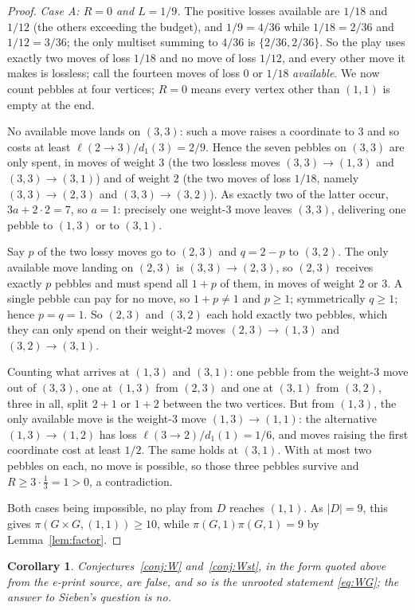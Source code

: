 \documentclass[11pt]{amsart}
\newtheorem{corollary}[theorem]{Corollary}
\theoremstyle{definition}
\begin{document}
\begin{proof}
\emph{Case A: $R=0$ and $L=1/9$.} The positive losses available are $1/18$
and $1/12$ (the others exceeding the budget), and $1/9=4/36$ while
$1/18=2/36$ and $1/12=3/36$; the only multiset summing to $4/36$ is
$\{2/36,2/36\}$. So the play uses exactly two moves of loss $1/18$ and no
move of loss $1/12$, and every other move it makes is lossless; call the
fourteen moves of loss $0$ or $1/18$ \emph{available}. We now count pebbles at
four vertices; $R=0$ means every vertex other than $(1,1)$ is empty at the
end.

No available move lands on $(3,3)$: such a move raises a coordinate to $3$
and so costs at least $\ell(2\to3)/d_1(3)=2/9$. Hence the seven pebbles on
$(3,3)$ are only spent, in moves of weight $3$ (the two lossless moves
$(3,3)\to(1,3)$ and $(3,3)\to(3,1)$) and of weight $2$ (the two moves of loss
$1/18$, namely $(3,3)\to(2,3)$ and $(3,3)\to(3,2)$). As exactly two of the
latter occur, $3a+2\cdot2=7$, so $a=1$: precisely one weight-$3$ move leaves
$(3,3)$, delivering one pebble to $(1,3)$ or to $(3,1)$.

Say $p$ of the two lossy moves go to $(2,3)$ and $q=2-p$ to $(3,2)$. The only
available move landing on $(2,3)$ is $(3,3)\to(2,3)$, so $(2,3)$ receives
exactly $p$ pebbles and must spend all $1+p$ of them, in moves of weight $2$
or $3$. A single pebble can pay for no move, so $1+p\neq1$ and $p\ge1$;
symmetrically $q\ge1$; hence
$p=q=1$. So $(2,3)$ and $(3,2)$ each hold exactly two pebbles, which they can
only spend on their weight-$2$ moves $(2,3)\to(1,3)$ and $(3,2)\to(3,1)$.

Counting what arrives at $(1,3)$ and $(3,1)$: one pebble from the weight-$3$
move out of $(3,3)$, one at $(1,3)$ from $(2,3)$ and one at $(3,1)$ from
$(3,2)$, three in all, split $2+1$ or $1+2$ between the two vertices. But from
$(1,3)$, the only available move is the weight-$3$ move $(1,3)\to(1,1)$: the
alternative $(1,3)\to(1,2)$ has loss $\ell(3\to2)/d_1(1)=1/6$, and moves
raising the first coordinate cost at least $1/2$. The same holds at $(3,1)$.
With at most two pebbles on each, no move is possible, so those three pebbles
survive and $R\ge3\cdot\tfrac13=1>0$, a contradiction.

Both cases being impossible, no play from $D$ reaches $(1,1)$. As
$|D|=9$, this gives $\pi(G\times G,(1,1))\ge10$, while
$\pi(G,1)\pi(G,1)=9$ by Lemma~\ref{lem:factor}.
\end{proof}

\begin{corollary}\label{cor:three}
Conjectures~\ref{conj:W} and~\ref{conj:Wst}, in the form quoted above from
the e-print source, are false, and so is the unrooted statement
\eqref{eq:WG}; the answer to Sieben's question is no.
\end{corollary}
\end{document}

